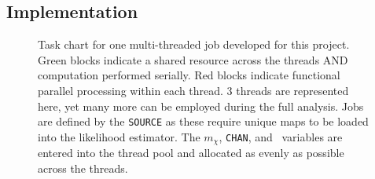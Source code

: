 \subsection{Implementation}\label{sec:mtd_implementation}

\begin{figure}[h]
    \caption{Task chart for one multi-threaded job developed for this project. Green blocks indicate a shared resource across the threads AND computation performed serially. Red blocks indicate functional parallel processing within each thread. 3 threads are represented here, yet many more can be employed during the full analysis. Jobs are defined by the \texttt{SOURCE} as these require unique maps to be loaded into the likelihood estimator. The $m_\chi$, \texttt{CHAN}, and \sv~variables are entered into the thread pool and allocated as evenly as possible across the threads.}
    \label{fig:mtd_multithreads}
\end{figure}